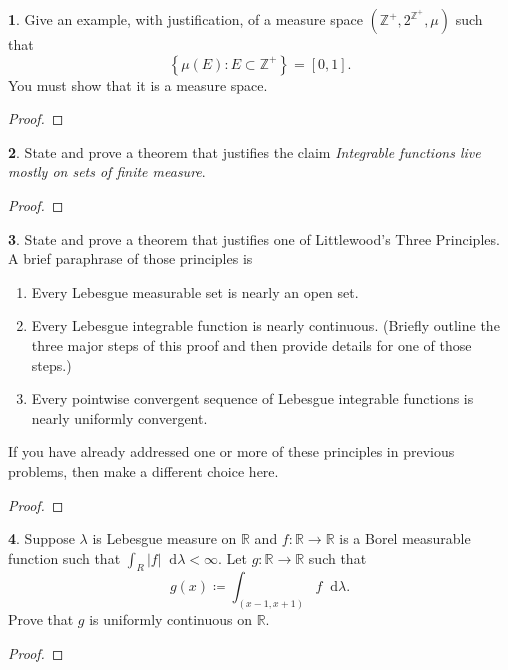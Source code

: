 \documentclass[12pt]{article}
\newcommand{\dd}{\mathop{}\!\mathrm{d}}
\theoremstyle{definition}
\newtheorem{ex}{}
\newenvironment{exercise}[1]{
	\renewcommand{\theex}{#1}
	\begin{ex}
		}{\end{ex}}
\begin{document}
\begin{exercise}{1(c)}
	Give an example, with justification, of a measure space $(\mathbb{Z}^+, 2^{\mathbb{Z}^+}, \mu)$ such that \begin{equation*}
		\left\lbrace \mu(E) : E \subset \mathbb{Z}^+ \right\rbrace = [0, 1].
	\end{equation*}
	You must show that it is a measure space.
\end{exercise}
\begin{proof}\end{proof}

\begin{exercise}{2(c)}
	State and prove a theorem that justifies the claim \textit{Integrable functions live mostly on sets of finite measure}.
\end{exercise}
\begin{proof}\end{proof}

\begin{exercise}{3(b)}
	State and prove a theorem that justifies one of Littlewood's Three Principles.
	A brief paraphrase of those principles is \begin{enumerate}[label=\roman*.]
		\item Every Lebesgue measurable set is nearly an open set.
		\item Every Lebesgue integrable function is nearly continuous.
		      (Briefly outline the three major steps of this proof and then provide details for one of those steps.)
		\item Every pointwise convergent sequence of Lebesgue integrable functions is nearly uniformly convergent.
	\end{enumerate}
	If you have already addressed one or more of these principles in previous problems, then make a different choice here.
\end{exercise}
\begin{proof}\end{proof}

\begin{exercise}{3(c)}
	Suppose $\lambda$ is Lebesgue measure on $\mathbb{R}$ and $f: \mathbb{R} \to \mathbb{R}$ is a Borel measurable function such that $\int_R |f| \dd \lambda < \infty$.
	Let $g : \mathbb{R} \to \mathbb{R}$ such that \begin{equation*}
		g(x) \coloneq \int_{(x-1, x+1)} f \dd\lambda.
	\end{equation*}
	Prove that $g$ is uniformly continuous on $\mathbb{R}$.
\end{exercise}
\begin{proof}\end{proof}
\end{document}
